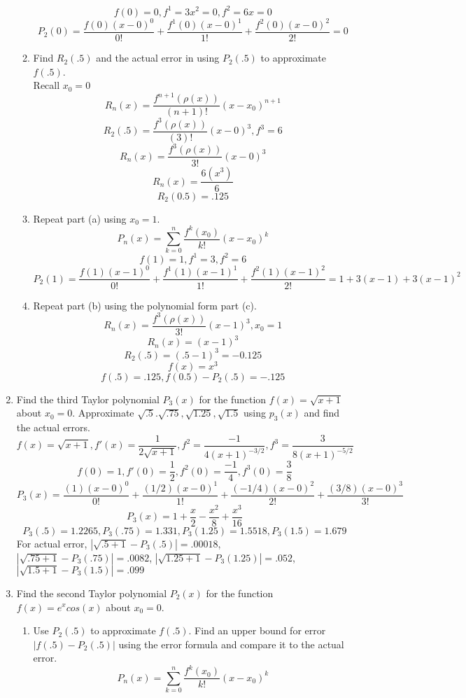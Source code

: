 \documentclass{article}
\begin{document}
\begin{enumerate}
\begin{enumerate}
        $$f(0) = 0, f^{1} = 3x^2 = 0, f^{2} = 6x = 0$$
        $$P_2(0) = \frac{f(0)(x-0)^{0}}{0!} + \frac{f^{1}(0)(x-0)^{1}}{1!} + \frac{f^{2}(0)(x-0)^{2}}{2!} = 0$$
        \item Find $R_2(.5)$ and the actual error in using $P_2(.5)$ to approximate $f(.5)$.\\Recall $x_0 = 0$
        $$R_n(x) = \frac{f^{n+1}(\rho (x))}{(n+1)!}(x-x_0)^{n+1}$$
        $$R_2(.5) = \frac{f^{3}(\rho(x))}{(3)!}(x-0)^{3}, f^{3} = 6$$
        $$R_n(x) = \frac{f^{3}(\rho(x))}{3!}(x-0)^3$$
        $$R_n(x) = \frac{6(x^3)}{6}$$
        $$R_2(0.5) = .125$$
        \item Repeat part (a) using $x_0 = 1$.
        $$P_n(x) = \sum_{k=0}^{n} \frac{f^{k}(x_0)}{k!}(x-x_0)^{k}$$
        $$f(1) = 1 , f^{1} = 3, f^{2} = 6$$
        $$P_2(1) = \frac{f(1)(x-1)^{0}}{0!} + \frac{f^{1}(1)(x-1)^{1}}{1!} + \frac{f^{2}(1)(x-1)^{2}}{2!} = 1 + 3(x-1) + 3(x-1)^2$$
        \item Repeat part (b) using the polynomial form part (c).
        $$R_n(x) = \frac{f^{3}(\rho(x))}{3!}(x-1)^3, x_0 = 1$$
        $$R_n(x) = (x-1)^3$$
        $$R_2(.5) = (.5-1)^3 = -0.125$$
        $$f(x) = x^3$$
        $$f(.5) = .125, f(0.5) - P_2(.5) = -.125$$
    \end{enumerate}
    \item Find the third Taylor polynomial $P_3(x)$ for the function $f(x) = \sqrt{x+1}$ about $x_0 = 0$. Approximate $\sqrt{.5}. \sqrt{.75},\sqrt{1.25},\sqrt{1.5}$ using $p_3(x)$ and find the actual errors.
    $$f(x) = \sqrt{x+1},f'(x) = \frac{1}{2\sqrt{x+1}}, f^{2} =\frac{-1}{4(x+1)^{-3/2}} , f^{3} = \frac{3}{8(x+1)^{-5/2}}$$
    $$f(0) = 1,f'(0) = \frac{1}{2}, f^{2}(0) =\frac{-1}{4} , f^{3}(0) = \frac{3}{8}$$
    $$P_3(x) = \frac{(1)(x-0)^{0}}{0!} + \frac{(1/2)(x-0)^1}{1!} + \frac{(-1/4)(x-0)^2}{2!} + \frac{(3/8)(x-0)^3}{3!}$$
    $$P_3(x) = 1 + \frac{x}{2} - \frac{x^2}{8} + \frac{x^3}{16}$$
    $$P_3(.5) = 1.2265, P_3(.75) = 1.331, P_3(1.25) = 1.5518 , P_3(1.5) = 1.679$$
    For actual error, $|\sqrt{.5 + 1} - P_3(.5)| = .00018$, 
    $|\sqrt{.75 + 1} - P_3(.75)| = .0082$, 
    $|\sqrt{1.25 + 1} - P_3(1.25)| = .052$,
    $|\sqrt{1.5 + 1} - P_3(1.5)| = .099$
    \item Find the second Taylor polynomial $P_2(x)$ for the function $f(x) = e^{x}cos(x)$ about $x_0 = 0$.
    \begin{enumerate}
        \item Use $P_2(.5)$ to approximate $f(.5)$. Find an upper bound for error $|f(.5) - P_2(.5)|$ using the error formula and compare it to the actual error.  $$P_n(x) = \sum_{k=0}^n\frac{f^{k}(x_0)}{k!}(x-x_0)^k$$

\end{enumerate}
\end{enumerate}
\end{document}
